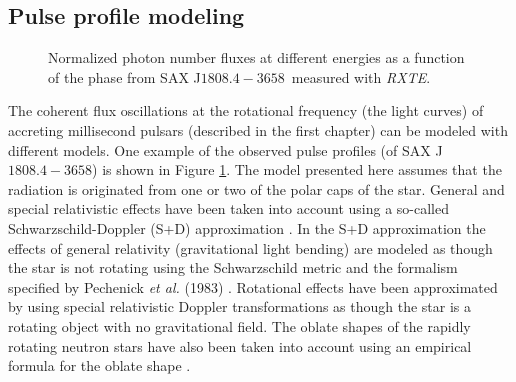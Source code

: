 \documentclass{wihuri}
\def\source{SAX J$1808.4-3658$}
\begin{document}
\subsection{Pulse profile modeling}


\begin{figure}
\centerline{} 
\caption{Normalized photon number fluxes at different energies as a function of the phase from \source \ measured with {\it RXTE}. 
\label{fig:saxdata}}
\end{figure}


The coherent flux oscillations at the rotational frequency (the light curves) of accreting millisecond pulsars (described in the first chapter) can be modeled with different models. One example of the observed pulse profiles (of \source) is shown in Figure \ref{fig:saxdata}. The model presented here assumes that the radiation is originated from one or two of the polar caps of the star. General and special relativistic effects have been taken into account using a so-called Schwarzschild-Doppler (S+D) approximation %
\cite{millerlamb98} %
\cite{poutagierlinskisax}. In the S+D approximation the effects of general relativity (gravitational light bending) are modeled as though the star is not rotating using the Schwarzschild metric and the formalism specified by
Pechenick {\it et al.} (1983) %
\cite{pechenick}. Rotational effects have been approximated by using special relativistic Doppler transformations as though the star is a rotating object with no gravitational field. The oblate shapes of the rapidly rotating neutron stars have also been taken into account using an empirical formula for the oblate shape \cite{algendy} \cite{morsink}.

\end{document}
